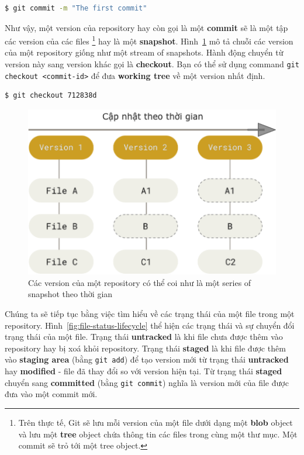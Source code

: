 \documentclass[a4paper, 11pt]{article}
\begin{document}
\begin{lstlisting}[language=bash]
$ git commit -m "The first commit"
\end{lstlisting}

Như vậy, một version của repository hay còn gọi là một \textbf{commit} sẽ là một tập các version của các files \footnote{Trên thực tế, Git sẽ lưu mỗi version của một file dưới dạng một \textbf{blob} object và lưu một \textbf{tree} object chứa thông tin các files trong cùng một thư mục. Một commit sẽ trỏ tới một tree object.} hay là một \textbf{snapshot}. Hình~\ref{fig:snapshot-stream} mô tả chuỗi các version của một repository giống như một stream of snapshots. Hành động chuyển từ version này sang version khác gọi là \textbf{checkout}. Bạn có thể sử dụng command \texttt{git checkout <commit-id>} để đưa \textbf{working tree} về một version nhất định.

 \begin{lstlisting}[language=bash]
$ git checkout 712838d
\end{lstlisting}

\begin{figure}
\centering
\includegraphics[scale=0.5]{git-snapshot-stream.png}
\caption{Các version của một repository có thể coi như là một series of snapshot theo thời gian}
\label{fig:snapshot-stream}
\end{figure}

Chúng ta sẽ tiếp tục bằng việc tìm hiểu về các trạng thái của một file trong một repository. Hình~\ref{fig:file-status-lifecycle} thể hiện các trạng thái và sự chuyển đổi trạng thái của một file. Trạng thái \textbf{untracked} là khi file chưa được thêm vào repository hay bị xoá khỏi repository. Trạng thái \textbf{staged} là khi file được thêm vào \textbf{staging area} (bằng \texttt{git add}) để tạo version mới từ trạng thái \textbf{untracked} hay \textbf{modified} - file đã thay đổi so với version hiện tại. Từ trạng thái \textbf{staged} chuyển sang \textbf{committed} (bằng \texttt{git commit}) nghĩa là version mới của file được đưa vào một commit mới.
\end{document}
